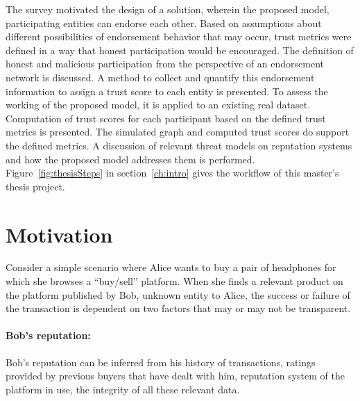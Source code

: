 The survey motivated the design of a solution, wherein the proposed model,
participating entities can endorse each other. Based on assumptions about
different possibilities of endorsement behavior that may occur, trust metrics
were defined in a way that honest participation would be encouraged. The
definition of honest and malicious participation from the perspective of an
endorsement network is discussed. A method to collect and quantify this
endorsement information to assign a trust score to each entity is presented. To
assess the working of the proposed model, it is applied to an existing real
dataset. Computation of trust scores for each participant based on the defined
trust metrics is presented. The simulated graph and computed trust scores do
support the defined metrics. A discussion of relevant threat models on
reputation systems and how the proposed model addresses them is performed.
Figure~\ref{fig:thesisSteps} in section~\ref{ch:intro} gives the workflow of
this master's thesis project.
 
\section{Motivation}
Consider a simple scenario where Alice wants to buy a pair of headphones for
which she browses a ``buy/sell'' platform. When she finds a relevant product on the
platform published by Bob, unknown entity to Alice, the success or failure of
the transaction is dependent on two factors that may or may not be transparent.
\paragraph{Bob's reputation:}Bob's reputation can be inferred from his history
of transactions, ratings provided by previous buyers that have dealt with him,
reputation system of the platform in use, the integrity of all these relevant
data.  

